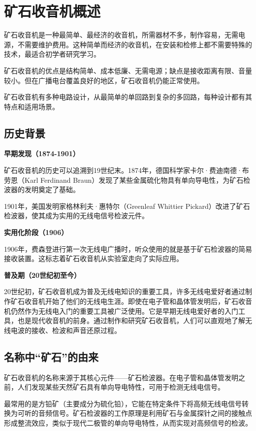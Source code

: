 \documentclass[12pt,UTF8]{ctexbook}
\begin{document}
\chapter{矿石收音机概述}

矿石收音机是一种最简单、最经济的收音机，所需器材不多，制作容易，无需电源，不需要维护费用。这种简单而经济的收音机，在安装和检修上都不需要特殊的技术，最适合初学者研究学习。

矿石收音机的优点是结构简单、成本低廉、无需电源；缺点是接收距离有限、音量较小。但在广播电台覆盖良好的地区，矿石收音机仍能正常使用。

矿石收音机有多种电路设计，从最简单的单回路到复杂的多回路，每种设计都有其特点和适用场景。

\section{历史背景}

\textbf{早期发现（1874-1901）}

矿石收音机的历史可以追溯到19世纪末。1874年，德国科学家卡尔·费迪南德·布劳恩（Karl Ferdinand Braun）发现了某些金属硫化物具有单向导电性，为矿石检波器的发明奠定了基础。

1901年，美国发明家格林利夫·惠特尔（Greenleaf Whittier Pickard）改进了矿石检波器，使其成为实用的无线电信号检波元件。

\textbf{实用化阶段（1906）}

1906年，费森登进行第一次无线电广播时，听众使用的就是基于矿石检波器的简易接收装置。这标志着矿石收音机从实验室走向了实际应用。

\textbf{普及期（20世纪初至今）}

20世纪初，矿石收音机成为普及无线电知识的重要工具，许多无线电爱好者通过制作矿石收音机开始了他们的无线电生涯。即使在电子管和晶体管发明后，矿石收音机仍然作为无线电入门的重要工具被广泛使用。它是早期无线电爱好者的入门工具，也是现代收音机的前身。通过制作和研究矿石收音机，人们可以直观地了解无线电波的接收、检波和声音还原过程。

\section{名称中“矿石”的由来}

矿石收音机的名称来源于其核心元件——矿石检波器。在电子管和晶体管发明之前，人们发现某些天然矿石具有单向导电特性，可用于检测无线电信号。

最常用的是方铅矿（主要成分为硫化铅），它能在特定条件下将高频无线电信号转换为可听的音频信号。矿石检波器的工作原理是利用矿石与金属探针之间的接触点形成整流效应，类似于现代二极管的单向导电特性，从而实现对高频信号的检波。
\end{document}
